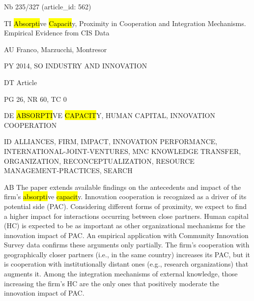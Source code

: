 \documentclass[a4paper]{article}
\begin{document}
\vspace*{-2cm}
Nb \tabto{0cm}235/327 (article\_id: 562)\par
TI \tabto{0cm}\hl{Absorpti}ve \hl{Capacit}y, Proximity in Cooperation and Integration Mechanisms. Empirical Evidence from CIS Data\par
AU \tabto{0cm}Franco, Marzucchi, Montresor\par
PY \tabto{0cm}2014, SO INDUSTRY AND INNOVATION\par
DT \tabto{0cm}Article\par
PG \tabto{0cm}26, NR 60, TC 0\par
DE \tabto{0cm}\hl{ABSORPTI}VE \hl{CAPACIT}Y, HUMAN CAPITAL, INNOVATION COOPERATION\par
ID \tabto{0cm}ALLIANCES, FIRM, IMPACT, INNOVATION PERFORMANCE, INTERNATIONAL-JOINT-VENTURES, MNC KNOWLEDGE TRANSFER, ORGANIZATION, RECONCEPTUALIZATION, RESOURCE MANAGEMENT-PRACTICES, SEARCH\par
AB \tabto{0cm}The paper extends available findings on the antecedents and impact of the firm's \hl{absorpti}ve \hl{capacit}y. Innovation cooperation is recognized as a driver of its potential side (PAC). Considering different forms of proximity, we expect to find a higher impact for interactions occurring between close partners. Human capital (HC) is expected to be as important as other organizational mechanisms for the innovation impact of PAC. An empirical application with Community Innovation Survey data confirms these arguments only partially. The firm's cooperation with geographically closer partners (i.e., in the same country) increases its PAC, but it is cooperation with institutionally distant ones (e.g., research organizations) that augments it. Among the integration mechanisms of external knowledge, those increasing the firm's HC are the only ones that positively moderate the innovation impact of PAC.\par
\clearpage
\end{document}
